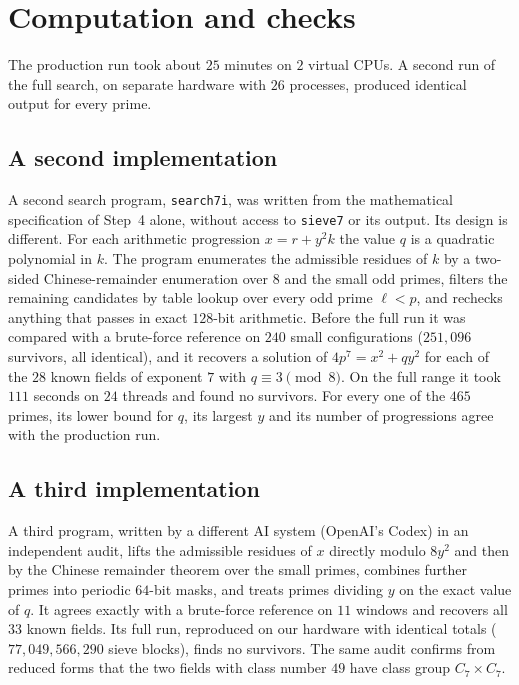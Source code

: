 \documentclass[11pt]{amsart}
\theoremstyle{remark}
\begin{document}
\section{Computation and checks}\label{sec:checks}

The production run took about $25$ minutes on $2$ virtual CPUs. A second run of the full search, on separate hardware with $26$ processes, produced identical output for every prime.

\subsection*{A second implementation}
A second search program, \texttt{search7i}, was written from the mathematical specification of Step~4 alone, without access to \texttt{sieve7} or its output. Its design is different. For each arithmetic progression $x=r+y^2k$ the value $q$ is a quadratic polynomial in $k$. The program enumerates the admissible residues of $k$ by a two-sided Chinese-remainder enumeration over $8$ and the small odd primes, filters the remaining candidates by table lookup over every odd prime $\ell<p$, and rechecks anything that passes in exact $128$-bit arithmetic. Before the full run it was compared with a brute-force reference on $240$ small configurations ($251{,}096$ survivors, all identical), and it recovers a solution of $4p^7=x^2+qy^2$ for each of the $28$ known fields of exponent $7$ with $q\equiv3\pmod8$. On the full range it took $111$ seconds on $24$ threads and found no survivors. For every one of the $465$ primes, its lower bound for $q$, its largest $y$ and its number of progressions agree with the production run.

\subsection*{A third implementation}
A third program, written by a different AI system (OpenAI's Codex) in an independent audit, lifts the admissible residues of $x$ directly modulo $8y^2$ and then by the Chinese remainder theorem over the small primes, combines further primes into periodic $64$-bit masks, and treats primes dividing $y$ on the exact value of $q$. It agrees exactly with a brute-force reference on $11$ windows and recovers all $33$ known fields. Its full run, reproduced on our hardware with identical totals ($77{,}049{,}566{,}290$ sieve blocks), finds no survivors. The same audit confirms from reduced forms that the two fields with class number $49$ have class group $C_7\times C_7$.
\end{document}

